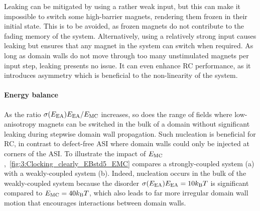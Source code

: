 Leaking can be mitigated by using a rather weak input, but this can make it impossible to switch some high-barrier magnets, rendering them frozen in their initial state.
This is to be avoided, as frozen magnets do not contribute to the fading memory of the system.
Alternatively, using a relatively strong input causes leaking but ensures that any magnet in the system can switch when required.
As long as domain walls do not move through too many unstimulated magnets per input step, leaking presents no issue.
It can even enhance RC performance, as it introduces asymmetry which is beneficial to the non-linearity of the system.

\paragraph{Energy balance}
As the ratio $\sigma(E_\mathrm{EA}) E_\mathrm{EA} / E_\mathrm{MC}$ increases, so does the range of fields where low-anisotropy magnets can be switched in the bulk of a domain without significant leaking during stepwise domain wall propagation.
Such nucleation is beneficial for RC, in contrast to defect-free ASI where domain walls could only be injected at corners of the ASI.
To illustrate the impact of $E_\mathrm{MC}$,~\cref{fig:3:Clocking_clearly_EBstd5_EMC} compares a strongly-coupled system (a) with a weakly-coupled system (b). %
Indeed, nucleation occurs in the bulk of the weakly-coupled system because the disorder $\sigma(\EEA)\EEA=10\kBT$ is significant compared to $\EMC = 40 \kBT$, which also leads to far more irregular domain wall motion that encourages interactions between domain walls.

